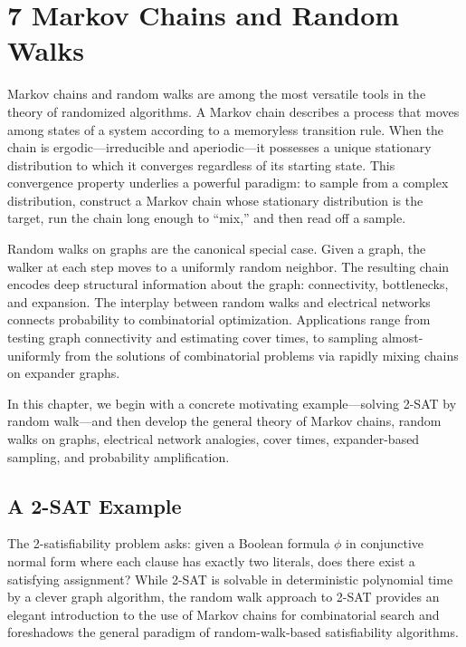 \documentclass[twoside,12pt]{book}
\theoremstyle{plain}
\theoremstyle{definition}
\theoremstyle{remark}
\begin{document}
\chapter*{7 Markov Chains and Random Walks}
\label{ch:markov-chains}

Markov chains and random walks are among the most versatile tools in the
theory of randomized algorithms. A Markov chain describes a process that
moves among states of a system according to a memoryless transition rule.
When the chain is ergodic---irreducible and aperiodic---it possesses a
unique stationary distribution to which it converges regardless of its
starting state. This convergence property underlies a powerful paradigm:
to sample from a complex distribution, construct a Markov chain whose
stationary distribution is the target, run the chain long enough to
``mix,'' and then read off a sample.

Random walks on graphs are the canonical special case. Given a graph, the
walker at each step moves to a uniformly random neighbor. The resulting
chain encodes deep structural information about the graph: connectivity,
bottlenecks, and expansion. The interplay between random walks and
electrical networks connects probability to combinatorial optimization.
Applications range from testing graph connectivity and estimating cover
times, to sampling almost-uniformly from the solutions of combinatorial
problems via rapidly mixing chains on expander graphs.

In this chapter, we begin with a concrete motivating example---solving
2-SAT by random walk---and then develop the general theory of Markov
chains, random walks on graphs, electrical network analogies, cover
times, expander-based sampling, and probability amplification.

\section{A 2-SAT Example}
\label{sec:2sat-example}

The 2-satisfiability problem asks: given a Boolean formula $\phi$ in
conjunctive normal form where each clause has exactly two literals, does
there exist a satisfying assignment? While 2-SAT is solvable in
deterministic polynomial time by a clever graph algorithm, the random
walk approach to 2-SAT provides an elegant introduction to the use of
Markov chains for combinatorial search and foreshadows the general
paradigm of random-walk-based satisfiability algorithms.
\end{document}
